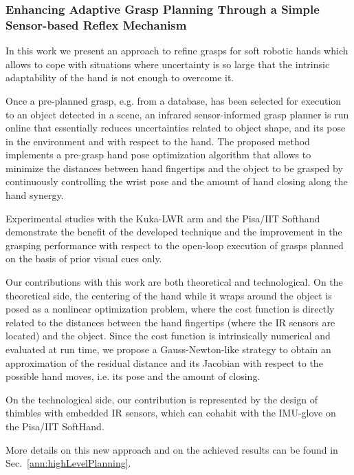 
\subsubsection{Enhancing Adaptive Grasp Planning Through
a Simple Sensor-based Reflex Mechanism}
\label{sec:IRSensorBasedGraspPlanning}

In this work we present an approach to refine grasps for soft robotic hands which allows to cope with situations where uncertainty is so large that the intrinsic adaptability of the hand is not enough to overcome it.

Once a pre-planned grasp, e.g. from a database, has been selected for execution to an object detected in a scene, an infrared sensor-informed grasp planner is run online that essentially reduces uncertainties related to object shape, and its pose in the environment and with respect to the hand. The proposed method implements a pre-grasp hand pose optimization algorithm
that allows to minimize the distances between hand fingertips and the object to be grasped by continuously controlling the wrist pose and the amount of hand closing along the hand synergy.

Experimental studies with the Kuka-LWR arm and the Pisa/IIT Softhand demonstrate the benefit of the developed technique and the improvement in the grasping performance with respect to the open-loop execution of grasps planned on the basis of prior visual cues only.

Our contributions with this work are both theoretical and technological. On the theoretical side, the centering of the hand while it wraps around the object is posed as a nonlinear optimization problem, where the cost function is directly related to the distances between the hand fingertips (where the IR sensors are located) and the object. Since the cost function is intrinsically numerical and evaluated at run time, we propose a Gauss-Newton-like strategy to obtain an approximation of the residual distance and its Jacobian with respect to the possible hand moves, i.e. its pose and the amount of closing.

On the technological side, our contribution is represented by the design of thimbles with embedded IR sensors, which can cohabit with the IMU-glove on the Pisa/IIT SoftHand.

More details on this new approach and on the achieved results can be found in Sec.~\ref{ann:highLevelPlanning}.

